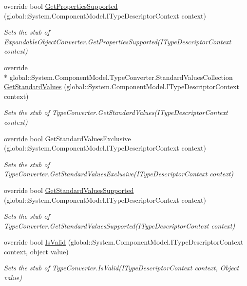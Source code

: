 \begin{DoxyCompactItemize}
override bool \hyperlink{class_system_1_1_component_model_1_1_fakes_1_1_stub_expandable_object_converter_a45dc72428ebec7432f1b53660b93292d}{Get\-Properties\-Supported} (global\-::\-System.\-Component\-Model.\-I\-Type\-Descriptor\-Context context)
\begin{DoxyCompactList}\small\item\em Sets the stub of Expandable\-Object\-Converter.\-Get\-Properties\-Supported(\-I\-Type\-Descriptor\-Context context)\end{DoxyCompactList}\item 
override \\*
global\-::\-System.\-Component\-Model.\-Type\-Converter.\-Standard\-Values\-Collection \hyperlink{class_system_1_1_component_model_1_1_fakes_1_1_stub_expandable_object_converter_a4aa077b4e56e27e8040f20b5a22f9f44}{Get\-Standard\-Values} (global\-::\-System.\-Component\-Model.\-I\-Type\-Descriptor\-Context context)
\begin{DoxyCompactList}\small\item\em Sets the stub of Type\-Converter.\-Get\-Standard\-Values(\-I\-Type\-Descriptor\-Context context)\end{DoxyCompactList}\item 
override bool \hyperlink{class_system_1_1_component_model_1_1_fakes_1_1_stub_expandable_object_converter_a326567775cbc0456a6fb6615b5d6180c}{Get\-Standard\-Values\-Exclusive} (global\-::\-System.\-Component\-Model.\-I\-Type\-Descriptor\-Context context)
\begin{DoxyCompactList}\small\item\em Sets the stub of Type\-Converter.\-Get\-Standard\-Values\-Exclusive(\-I\-Type\-Descriptor\-Context context)\end{DoxyCompactList}\item 
override bool \hyperlink{class_system_1_1_component_model_1_1_fakes_1_1_stub_expandable_object_converter_af74c948b328497ee65f7d604d1407c80}{Get\-Standard\-Values\-Supported} (global\-::\-System.\-Component\-Model.\-I\-Type\-Descriptor\-Context context)
\begin{DoxyCompactList}\small\item\em Sets the stub of Type\-Converter.\-Get\-Standard\-Values\-Supported(\-I\-Type\-Descriptor\-Context context)\end{DoxyCompactList}\item 
override bool \hyperlink{class_system_1_1_component_model_1_1_fakes_1_1_stub_expandable_object_converter_a562da323722c22495b839e82facd2997}{Is\-Valid} (global\-::\-System.\-Component\-Model.\-I\-Type\-Descriptor\-Context context, object value)
\begin{DoxyCompactList}\small\item\em Sets the stub of Type\-Converter.\-Is\-Valid(\-I\-Type\-Descriptor\-Context context, Object value)\end{DoxyCompactList}\end{DoxyCompactItemize}
